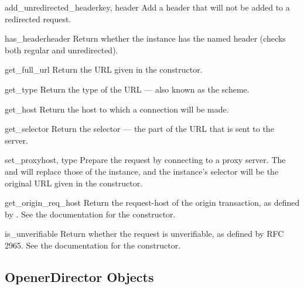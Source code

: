\begin{methoddesc}[Request]{add_unredirected_header}{key, header}
Add a header that will not be added to a redirected request.
\end{methoddesc}

\begin{methoddesc}[Request]{has_header}{header}
Return whether the instance has the named header (checks both regular
and unredirected).
\end{methoddesc}

\begin{methoddesc}[Request]{get_full_url}{}
Return the URL given in the constructor.
\end{methoddesc}

\begin{methoddesc}[Request]{get_type}{}
Return the type of the URL --- also known as the scheme.
\end{methoddesc}

\begin{methoddesc}[Request]{get_host}{}
Return the host to which a connection will be made.
\end{methoddesc}

\begin{methoddesc}[Request]{get_selector}{}
Return the selector --- the part of the URL that is sent to
the server.
\end{methoddesc}

\begin{methoddesc}[Request]{set_proxy}{host, type}
Prepare the request by connecting to a proxy server. The 
and  will replace those of the instance, and the instance's
selector will be the original URL given in the constructor.
\end{methoddesc}

\begin{methoddesc}[Request]{get_origin_req_host}{}
Return the request-host of the origin transaction, as defined by
.  See the documentation for the 
constructor.
\end{methoddesc}

\begin{methoddesc}[Request]{is_unverifiable}{}
Return whether the request is unverifiable, as defined by RFC 2965.
See the documentation for the  constructor.
\end{methoddesc}


\subsection{OpenerDirector Objects \label{opener-director-objects}}

